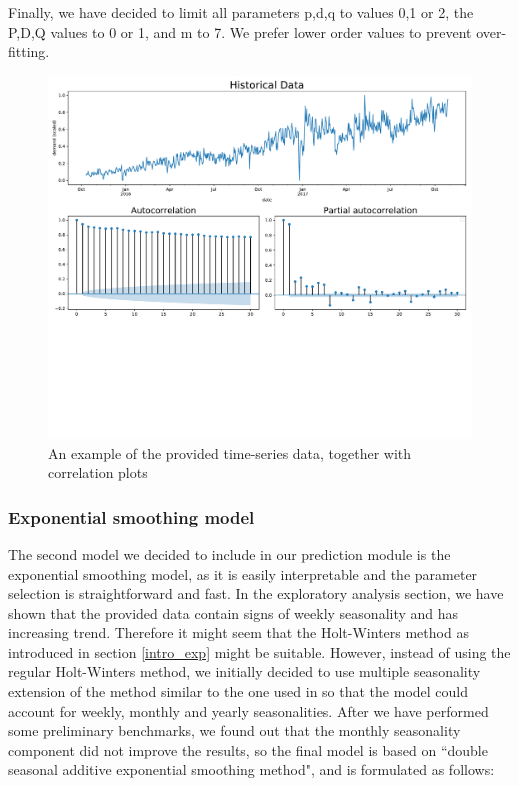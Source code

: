 \documentclass[11pt,a4paper]{article}
\begin{document}
Finally, we have decided to limit all parameters p,d,q to values 0,1 or 2, the P,D,Q values to 0 or 1, and m to 7. We prefer lower order values to prevent over-fitting.

\begin{figure}
  \includegraphics[width=\linewidth]{figures/series_ex.pdf}
  \caption[An example of the provided time-series data]{An example of the provided time-series data, together with correlation plots}
  \label{fig:exploratory}
\end{figure}


\subsubsection{Exponential smoothing model}
The second model we decided to include in our prediction module is the exponential smoothing model, as it is easily interpretable and the parameter selection is straightforward and fast. In the exploratory analysis section, we have shown that the provided data contain signs of weekly seasonality and has increasing trend. Therefore it might seem that the Holt-Winters method as introduced in section \ref{intro_exp} might be suitable. However, instead of using the regular Holt-Winters method, we initially decided to use multiple seasonality extension of the method similar to the one used in \cite{shahin2017using} so that the model could account for weekly, monthly and yearly seasonalities. After we have performed some preliminary benchmarks, we found out that the monthly seasonality component did not improve the results, so the final model is based on ``double seasonal additive exponential smoothing method", and is formulated as follows:
\end{document}
